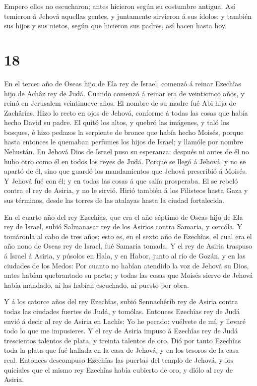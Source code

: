  Empero ellos no escucharon; antes hicieron según su
costumbre antigua.  Así temieron á Jehová aquellas gentes,
y juntamente sirvieron á sus ídolos: y también sus hijos y sus nietos,
según que hicieron sus padres, así hacen hasta hoy.

\hypertarget{section-17}{%
\section{18}\label{section-17}}

 En el tercer año de Oseas hijo de Ela rey de Israel,
comenzó á reinar Ezechîas hijo de Achâz rey de Judá.  Cuando
comenzó á reinar era de veinticinco años, y reinó en Jerusalem
veintinueve años. El nombre de su madre fué Abi hija de Zachârías.
 Hizo lo recto en ojos de Jehová, conforme á todas las cosas
que había hecho David su padre.  El quitó los altos, y
quebró las imágenes, y taló los bosques, é hizo pedazos la serpiente de
bronce que había hecho Moisés, porque hasta entonces le quemaban
perfumes los hijos de Israel; y llamóle por nombre Nehustán.
 En Jehová Dios de Israel puso su esperanza: después ni
antes de él no hubo otro como él en todos los reyes de Judá.
 Porque se llegó á Jehová, y no se apartó de él, sino que
guardó los mandamientos que Jehová prescribió á Moisés.  Y
Jehová fué con él; y en todas las cosas á que salía prosperaba. El se
rebeló contra el rey de Asiria, y no le sirvió.  Hirió
también á los Filisteos hasta Gaza y sus términos, desde las torres de
las atalayas hasta la ciudad fortalecida.

 En el cuarto año del rey Ezechîas, que era el año séptimo
de Oseas hijo de Ela rey de Israel, subió Salmanasar rey de los Asirios
contra Samaria, y cercóla.  Y tomáronla al cabo de tres
años; esto es, en el sexto año de Ezechîas, el cual era el año nono de
Oseas rey de Israel, fué Samaria tomada.  Y el rey de
Asiria traspuso á Israel á Asiria, y púsolos en Hala, y en Habor, junto
al río de Gozán, y en las ciudades de los Medos:  Por
cuanto no habían atendido la voz de Jehová su Dios, antes habían
quebrantado su pacto; y todas las cosas que Moisés siervo de Jehová
había mandado, ni las habían escuchado, ni puesto por obra.

 Y á los catorce años del rey Ezechîas, subió Sennachêrib
rey de Asiria contra todas las ciudades fuertes de Judá, y tomólas.
 Entonces Ezechîas rey de Judá envió á decir al rey de
Asiria en Lachîs: Yo he pecado: vuélvete de mí, y llevaré todo lo que me
impusieres. Y el rey de Asiria impuso á Ezechîas rey de Judá trescientos
talentos de plata, y treinta talentos de oro.  Dió por
tanto Ezechîas toda la plata que fué hallada en la casa de Jehová, y en
los tesoros de la casa real.  Entonces descompuso Ezechîas
las puertas del templo de Jehová, y los quiciales que el mismo rey
Ezechîas había cubierto de oro, y diólo al rey de Asiria.


